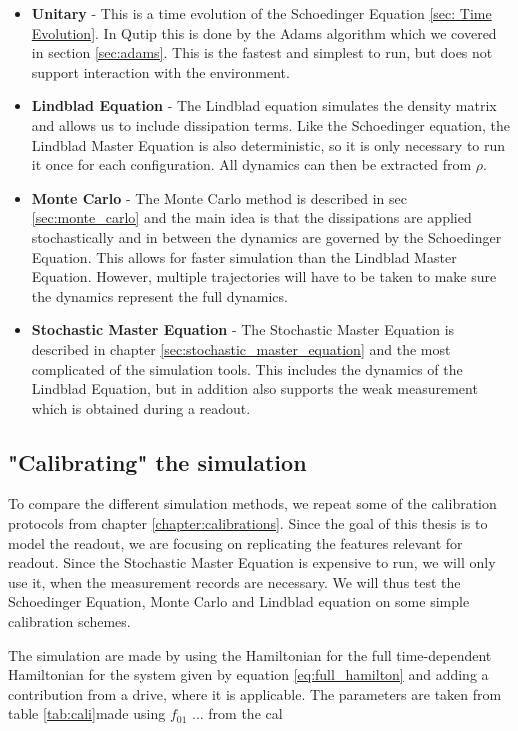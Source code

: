 \begin{itemize}
    \item \textbf{Unitary} - This is a time evolution of the Schoedinger Equation \ref{sec: Time Evolution}. In Qutip this is done by the Adams algorithm which we covered in section \ref{sec:adams}. This is the fastest and simplest to run, but does not support interaction with the environment.  
    \item \textbf{Lindblad Equation} - The Lindblad equation simulates the density matrix and allows us to include dissipation terms. Like the Schoedinger equation, the Lindblad Master Equation is also deterministic, so it is only necessary to run it once for each configuration. All dynamics can then be extracted from $\rho$. 
    \item \textbf{Monte Carlo} - The Monte Carlo method is described in sec \ref{sec:monte_carlo} and the main idea is that the dissipations are applied stochastically and in between the dynamics are governed by the Schoedinger Equation. This allows for faster simulation than the Lindblad Master Equation. However, multiple trajectories will have to be taken to make sure the dynamics represent the full dynamics.
    \item \textbf{Stochastic Master Equation} - The Stochastic Master Equation is described in chapter \ref{sec:stochastic_master_equation} and the most complicated of the simulation tools. This includes the dynamics of the Lindblad Equation, but in addition also supports the weak measurement which is obtained during a readout.
\end{itemize}

\subsection{"Calibrating" the simulation}
To compare the different simulation methods, we repeat some of the calibration protocols from chapter \ref{chapter:calibrations}. Since the goal of this thesis is to model the readout, we are focusing on replicating the features relevant for readout. Since the Stochastic Master Equation is expensive to run, we will only use it, when the measurement records are necessary. We will thus test the Schoedinger Equation, Monte Carlo and Lindblad equation on some simple calibration schemes. 

The simulation are made by using the Hamiltonian for the full time-dependent Hamiltonian for the system given by equation \ref{eq:full_hamilton} and adding a contribution from a drive, where it is applicable. The parameters are taken from table \ref{tab:cali}made using $f_{01}$ ... from the cal

